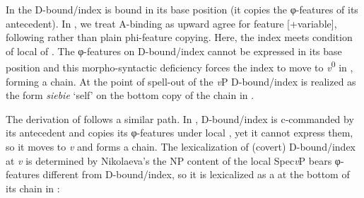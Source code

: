\documentclass[output=paper,nonflat,colorlinks,citecolor=brown,newtxmath]{langsci/langscibook}
\begin{document}
\z\z

\noindent In  the D-bound/index is bound in its base position (it copies the φ-features of its antecedent). In \cite{witkosetal_forth}, we treat A-binding as upward agree for feature [+variable], following \cite{hicks2009} rather than plain phi-feature copying.  Here, the index meets  condition of local  of . The φ-features on D-bound/index cannot be expressed in its base position and this morpho-syntactic deficiency forces the index to move to \textit{v}\textsuperscript{0} in , forming a chain. At the point of spell-out of the \textit{v}P D-bound/index is realized as the  form \textit{siebie} ‘self’ on the bottom copy of the chain in .

The derivation of  follows a similar path. In , D-bound/index is c-commanded by its antecedent and copies its φ-features under local , yet it cannot express them, so it moves to \textit{v} and forms a chain. The lexicalization of (covert) D-bound/index at \textit{v} is determined by Nikolaeva’s  the NP content of the local Spec\textit{v}P bears φ-features different from D-bound/index, so it is lexicalized as a  at the bottom of its chain in :
\end{document}

